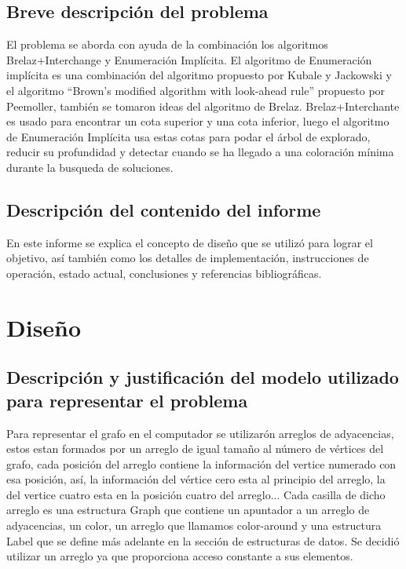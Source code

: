 \documentclass[a4paper,10pt]{article}
\begin{document}
\subsection{Breve descripción del problema}
El problema se aborda con ayuda de la combinación los algoritmos 
Brelaz+Interchange y Enumeraci\'on Impl\'icita. El algoritmo de
Enumeraci\'on impl\'icita es una combinaci\'on del algoritmo propuesto por Kubale y
Jackowski y el algoritmo ``Brown's modified algorithm with look-ahead
rule'' propuesto por Peemoller, tambi\'en se tomaron ideas del algoritmo
de Brelaz.
Brelaz+Interchante es usado para encontrar un cota superior y una
cota inferior, luego el algoritmo de Enumeración Implícita usa estas
cotas para podar el \'arbol de explorado, reducir su profundidad
y detectar cuando se ha llegado a una coloraci\'on m\'inima durante la
busqueda de soluciones.

\subsection{Descripción del contenido del informe}
En este informe se explica el concepto de diseño que se utilizó
para lograr el objetivo, así también como los detalles de implementación, 
instrucciones de operación, estado actual, conclusiones y referencias bibliográficas.

\section{Diseño}

\subsection{Descripción y justificación del modelo utilizado para
  representar el problema}

  Para representar el grafo en el computador se utilizar\'on arreglos de
  adyacencias, estos estan formados por un arreglo de igual tamaño al número de
  vértices del grafo, cada posici\'on del arreglo contiene la
  informaci\'on del vertice numerado con esa posici\'on, as\'i, la
  informaci\'on del v\'ertice cero esta al principio del arreglo, la del
  vertice cuatro esta en la posici\'on cuatro del arreglo... Cada
  casilla de dicho arreglo es una estructura Graph que contiene un
  apuntador a un arreglo de adyacencias, un color, un arreglo que
  llamamos color-around y una estructura Label que se define m\'as
  adelante en la secci\'on de estructuras de datos. Se decidió utilizar
  un arreglo ya que proporciona acceso constante a sus elementos.\\
\end{document}
